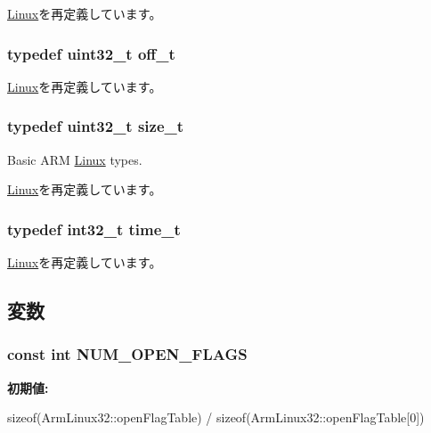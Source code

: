 \hyperlink{classLinux_a0001c50514d27f51d408e051dc803ad4}{Linux}を再定義しています。\hypertarget{classArmLinux32_aac46e03c2018bada012333c31f41df12}{
\subsubsection[{off\_\-t}]{\setlength{\rightskip}{0pt plus 5cm}typedef {\bf uint32\_\-t} {\bf off\_\-t}}}
\label{classArmLinux32_aac46e03c2018bada012333c31f41df12}


\hyperlink{classLinux_a2cb84cf5f02a29b7e8f237ff151a9225}{Linux}を再定義しています。\hypertarget{classArmLinux32_a29d85914ddff32967d85ada69854206d}{
\subsubsection[{size\_\-t}]{\setlength{\rightskip}{0pt plus 5cm}typedef {\bf uint32\_\-t} {\bf size\_\-t}}}
\label{classArmLinux32_a29d85914ddff32967d85ada69854206d}


Basic ARM \hyperlink{classLinux}{Linux} types. 

\hyperlink{classLinux_a186ea1339bffb378854987065835afe3}{Linux}を再定義しています。\hypertarget{classArmLinux32_a9c837e14046ebcf4099bb559bd6637ca}{
\subsubsection[{time\_\-t}]{\setlength{\rightskip}{0pt plus 5cm}typedef int32\_\-t {\bf time\_\-t}}}
\label{classArmLinux32_a9c837e14046ebcf4099bb559bd6637ca}


\hyperlink{classLinux_a7f5991675a84025dc7c24754a9b257c0}{Linux}を再定義しています。

\subsection{変数}
\hypertarget{classArmLinux32_ad85b9918c8f2c8739537a002dc1dc526}{
\subsubsection[{NUM\_\-OPEN\_\-FLAGS}]{\setlength{\rightskip}{0pt plus 5cm}const int {\bf NUM\_\-OPEN\_\-FLAGS}}}
\label{classArmLinux32_ad85b9918c8f2c8739537a002dc1dc526}
{\bfseries 初期値:}
\begin{DoxyCode}
 sizeof(ArmLinux32::openFlagTable) /
                                       sizeof(ArmLinux32::openFlagTable[0])
\end{DoxyCode}


